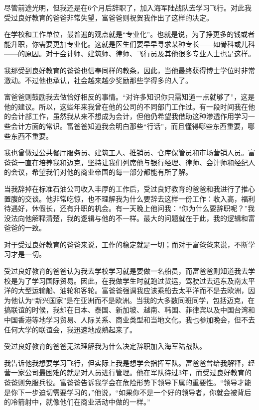 尽管前途光明，但我还是在6个月后辞职了，加入海军陆战队去学习飞行。对此我受过良好教育的爸爸非常失望，富爸爸则祝贺我作出了这样的决定。

在学校和工作单位，最普遍的观点就是“专业化”。也就是说，为了挣更多的钱或者能升职，你需要更加专业化。这就是医生们要早早寻求某种专长——如骨科或儿科——的原因。对于会计师、建筑师、律师、飞行员及其他很多专业人士也是这样。

我那受到良好教育的爸爸也信奉同样的教条，因此，当他最终获得博士学位时非常激动。不过他也承认，社会越来越少奖励那些学得多的人了。

富爸爸则鼓励我去做恰好相反的事情。“对许多知识你只需知道一点就够了”，这是他的建议。所以，这些年来我曾在他的公司的不同部门工作过。有一段时间我在他的会计部工作，虽然我从来不想成为会计，但他仍希望我借助这种渗透作用学习一些会计方面的常识。富爸爸知道我会明白那些“行话”，而且懂得哪些东西重要，哪些东西不重要。

我也曾做过公共餐厅服务员、建筑工人、推销员、仓库保管员和市场营销人员。富爸爸一直在培养我和迈克，坚持让我们列席他与银行经理、律师、会计师和经纪人的会议，希望我们对他的商业帝国的每一部分都能有所了解。

当我辞掉在标准石油公司收入丰厚的工作后，受过良好教育的爸爸和我进行了推心置腹的交谈。他非常吃惊，也不理解我为什么要辞去这样一份工作：收入高，福利待遇好，休假长，还有升职的机会。有一天晚上他问我：“你为什么要辞职呢？”我没法向他解释清楚，我的逻辑与他的不一样。最大的问题就在于此，我的逻辑和富爸爸的一致。

对于受过良好教育的爸爸来说，工作的稳定就是一切；而对于富爸爸来说，不断学习才是一切。

受过良好教育的爸爸认为我去学校学习就是要做一名船员，而富爸爸则知道我去学校是为了学习国际贸易。因此，在我做学生时就跑过货运，驾驶过去远东及南太平洋的大型运输船、油轮和客轮。富爸爸强调我应该乘船去太平洋而不是去欧洲，因为他认为“新兴国家”是在亚洲而不是欧洲。当我的大多数同班同学，包括迈克，在搞联谊的时候，我却在日本、泰国、新加坡、越南、韩国、菲律宾以及中国台湾和中国香港等地学习贸易、人际关系、商业类型和当地文化。我也参加晚会，但不去任何大学的联谊会，我迅速地成熟起来了。

受过良好教育的爸爸无法理解我为什么决定辞职加入海军陆战队。

我告诉他我想要学习飞行，但实际上我是想学会指挥军队。富爸爸曾给我解释，经营一家公司最困难的就是对人员进行管理。他在军队待过3年，而受过良好教育的爸爸则免服兵役。富爸爸告诉我学会在危险形势下领导下属的重要性。“领导才能是你下一步迫切需要学习的，”他说，“如果你不是一个好的领导者，你就会被背后的冷箭射中，就像他们在商业活动中做的一样。”

